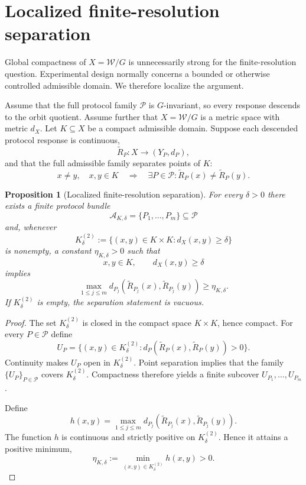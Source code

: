 \documentclass[11pt]{article}
\newtheorem{proposition}[definition]{Proposition}
\newcommand{\W}{\mathcal W}
\newcommand{\Pcal}{\mathcal P}
\newcommand{\Acal}{\mathcal A}
\begin{document}
\section{Localized finite-resolution separation}

Global compactness of $X=\W/G$ is unnecessarily strong for the finite-resolution
question. Experimental design normally concerns a bounded or otherwise
controlled admissible domain. We therefore localize the argument.

Assume that the full protocol family $\Pcal$ is $G$-invariant, so every
response descends to the orbit quotient. Assume further that $X=\W/G$ is a
metric space with metric $d_X$. Let $K\subseteq X$ be a compact admissible
domain. Suppose each descended protocol response is continuous,
\[
\widetilde R_P:X\to(Y_P,d_P),
\]
and that the full admissible family separates points of $K$:
\[
x\neq y,
\quad x,y\in K
\quad\Longrightarrow\quad
\exists P\in\Pcal:
\widetilde R_P(x)\neq\widetilde R_P(y).
\]

\begin{proposition}[Localized finite-resolution separation]\label{prop:finite-resolution}
For every $\delta>0$ there exists a finite protocol bundle
\[
\Acal_{K,\delta}=\{P_1,\dots,P_m\}\subseteq\Pcal
\]
and, whenever
\[
K^{(2)}_{\delta}
:=
\{(x,y)\in K\times K:d_X(x,y)\ge\delta\}
\]
is nonempty, a constant $\eta_{K,\delta}>0$ such that
\[
x,y\in K,
\qquad
d_X(x,y)\ge\delta
\]
implies
\[
\max_{1\le j\le m}
 d_{P_j}\!\left(
 \widetilde R_{P_j}(x),
 \widetilde R_{P_j}(y)
 \right)
\ge\eta_{K,\delta}.
\]
If $K^{(2)}_{\delta}$ is empty, the separation statement is vacuous.
\end{proposition}

\begin{proof}
The set $K^{(2)}_{\delta}$ is closed in the compact space $K\times K$, hence
compact. For every $P\in\Pcal$ define
\[
U_P
=
\{(x,y)\in K^{(2)}_{\delta}:
 d_P(\widetilde R_P(x),\widetilde R_P(y))>0\}.
\]
Continuity makes $U_P$ open in $K^{(2)}_{\delta}$. Point separation implies
that the family $\{U_P\}_{P\in\Pcal}$ covers $K^{(2)}_{\delta}$. Compactness
therefore yields a finite subcover $U_{P_1},\dots,U_{P_m}$.

Define
\[
h(x,y)
=
\max_{1\le j\le m}
 d_{P_j}(\widetilde R_{P_j}(x),\widetilde R_{P_j}(y)).
\]
The function $h$ is continuous and strictly positive on
$K^{(2)}_{\delta}$. Hence it attains a positive minimum,
\[
\eta_{K,\delta}
:=
\min_{(x,y)\in K^{(2)}_{\delta}}h(x,y)>0.
\]
\end{proof}
\end{document}
